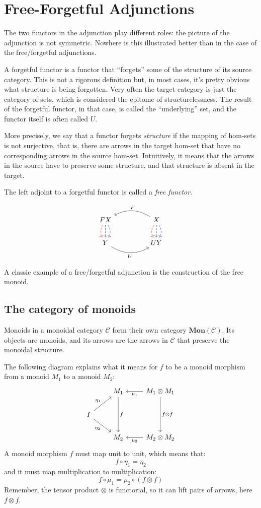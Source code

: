 \documentclass[DaoFP]{subfiles}
\begin{document}
\section{Free-Forgetful Adjunctions}
The two functors in the adjunction play different roles: the picture of the adjunction is not symmetric. Nowhere is this illustrated better than in the case of the free/forgetful adjunctions. 

A forgetful functor is a functor that ``forgets'' some of the structure of its source category. This is not a rigorous definition but, in most cases, it's pretty obvious what structure is being forgotten. Very often the target category is just the category of sets, which is considered the epitome of structurelessness. The result of the forgetful functor, in that case, is called the ``underlying'' set, and the functor itself is often called $U$. 

More precisely, we say that a functor forgets \emph{structure} if the mapping of hom-sets is not surjective, that is, there are arrows in the target hom-set that have no corresponding arrows in the source hom-set. Intuitively, it means that the arrows in the source have to preserve some structure, and that structure is absent in the target. 

The left adjoint to a forgetful functor is called a \emph{free functor}.

\[
 \begin{tikzcd}
F X
\arrow[d, bend right, red, dashed]
\arrow[d, dashed]
\arrow[d, bend left, blue, dashed]
  &&
  X
\arrow[d, bend right, red, dashed]
\arrow[d, dashed]
\arrow[d, bend left, blue, dashed]
 \arrow[ll, bend right, "F"']
 \\
Y
   \arrow[rr, bend right, "U"']
 &&
 U Y
  \end{tikzcd}
\]

A classic example of a free/forgetful adjunction is the construction of the free monoid.


\subsection{The category of monoids}
Monoids in a monoidal category $\mathcal{C}$ form their own category $\mathbf{Mon}(\mathcal{C})$. Its objects are monoids, and its arrows are the arrows in $\mathcal{C}$ that preserve the monoidal structure. 

The following diagram explains what it means for $f$ to be a monoid morphism from a monoid $M_1$ to a monoid $M_2$:
\[
 \begin{tikzcd}
 & M_1
 \arrow[dd, "f"]
 & M_1 \otimes M_1
 \arrow[l, "\mu_1"]
 \arrow[dd, "f \otimes f"]
 \\
 I
 \arrow[ru, "\eta_1"]
 \arrow[rd, "\eta_2"']
 \\
 & M_2
 & M_2 \otimes M_2
 \arrow[l, "\mu_2"]
  \end{tikzcd}
\]
A monoid morphism $f$ must map unit to unit, which means that:
\[ f \circ \eta_1 = \eta_2 \]
and it must map multiplication to multiplication:
\[ f \circ \mu_1 = \mu_2 \circ (f \otimes f)\]
Remember, the tensor product $\otimes$ is functorial, so it can lift pairs of arrows, here $f \otimes f$.
\end{document}
